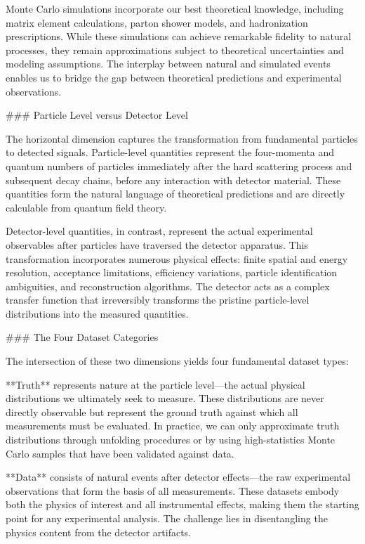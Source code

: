\begin{definition}
Monte Carlo simulations incorporate our best theoretical knowledge, including matrix element calculations, parton shower models, and hadronization prescriptions. While these simulations can achieve remarkable fidelity to natural processes, they remain approximations subject to theoretical uncertainties and modeling assumptions. The interplay between natural and simulated events enables us to bridge the gap between theoretical predictions and experimental observations.

### Particle Level versus Detector Level

The horizontal dimension captures the transformation from fundamental particles to detected signals. Particle-level quantities represent the four-momenta and quantum numbers of particles immediately after the hard scattering process and subsequent decay chains, before any interaction with detector material. These quantities form the natural language of theoretical predictions and are directly calculable from quantum field theory.

Detector-level quantities, in contrast, represent the actual experimental observables after particles have traversed the detector apparatus. This transformation incorporates numerous physical effects: finite spatial and energy resolution, acceptance limitations, efficiency variations, particle identification ambiguities, and reconstruction algorithms. The detector acts as a complex transfer function that irreversibly transforms the pristine particle-level distributions into the measured quantities.

### The Four Dataset Categories

The intersection of these two dimensions yields four fundamental dataset types:

**Truth** represents nature at the particle level—the actual physical distributions we ultimately seek to measure. These distributions are never directly observable but represent the ground truth against which all measurements must be evaluated. In practice, we can only approximate truth distributions through unfolding procedures or by using high-statistics Monte Carlo samples that have been validated against data.

**Data** consists of natural events after detector effects—the raw experimental observations that form the basis of all measurements. These datasets embody both the physics of interest and all instrumental effects, making them the starting point for any experimental analysis. The challenge lies in disentangling the physics content from the detector artifacts.


\end{definition}

